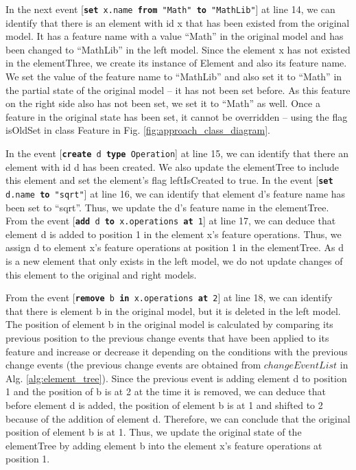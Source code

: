 \documentclass{llncs}
\begin{document}
In the next event [\texttt{\small \textbf{set} x.name \textbf{from} "Math" \textbf{to} "MathLib"}] at line 14, we can identify that there is an element with id \textsf{x} that has been existed from the original model. It has a feature \textsf{name} with a value ``Math'' in the original model and has been changed to ``MathLib'' in the left model. Since the element \textsf{x} has not existed in the \textsf{elementThree}, we create its instance of \textsf{Element} and also its feature \textsf{name}. We set the value of the feature \textsf{name} to ``MathLib'' and also set it to ``Math'' in the partial state of the original model -- it has not been set before. As this feature on the right side also has not been set, we set it to ``Math'' as well. Once a feature in the original state has been set, it cannot be overridden -- using the flag \textsf{isOldSet} in class \textsf{Feature} in Fig. \ref{fig:approach_class_diagram}. 

In the event [\texttt{\small \textbf{create} d \textbf{type} Operation}] at line 15, we can identify that there an element with id \textsf{d} has been created. We also update the \textsf{elementTree} to include this element and set the element's flag \textsf{leftIsCreated} to \textsf{true}. In the event [\texttt{\small \textbf{set} d.name \textbf{to} "sqrt"}] at line 16, we can identify that element \textsf{d}'s feature \textsf{name} has been set to ``sqrt''. Thus, we update the \textsf{d}'s feature \textsf{name} in the \textsf{elementTree}. From the event [\texttt{\small \textbf{add} d \textbf{to} x.operations \textbf{at} 1}] at line 17, we can deduce that element \textsf{d} is added to position 1 in the element \textsf{x}'s feature \textsf{operations}. Thus, we assign \textsf{d} to element \textsf{x}'s feature \textsf{operations} at position 1 in the \textsf{elementTree}. As \textsf{d} is a new element that only exists in the left model, we do not update changes of this element to the original and right models. 

From the event [\texttt{\small \textbf{remove} b \textbf{in} x.operations \textbf{at} 2}] at line 18, we can identify that there is element \textsf{b} in the original model, but it is deleted in the left model. The position of element \textsf{b} in the original model is calculated by comparing its previous position to the previous change events that have been applied to its feature and increase or decrease it depending on the conditions with the previous change events (the previous change events are obtained from $changeEventList$ in Alg. \ref{alg:element_tree}). Since the previous event is adding element \textsf{d} to position 1 and the position of \textsf{b} is at 2 at the time it is removed, we can deduce that before element \textsf{d} is added, the position of element \textsf{b} is at 1 and shifted to 2 because of the addition of element \textsf{d}.  Therefore, we can conclude that the original position of element \textsf{b} is at 1. Thus, we update the original state of the \textsf{elementTree} by adding element \textsf{b} into the element \textsf{x}'s feature \textsf{operations} at position 1.  
\end{document}
